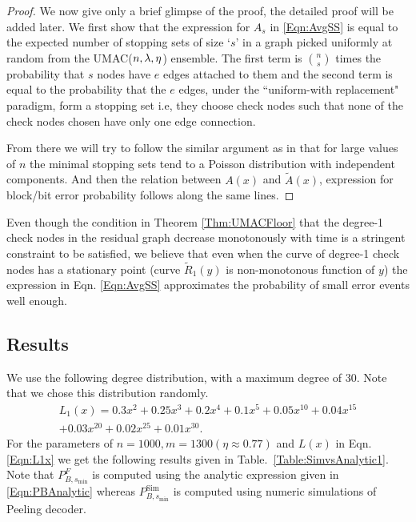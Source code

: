 \begin{proof}
We now give only a brief glimpse of the proof, the detailed proof will be added later. We first show that the expression for $A_{s}$ in \eqref{Eqn:AvgSS} is equal to the expected number of stopping sets of size `$s$' in a graph picked uniformly at random from the UMAC($n,\lambda,\eta$) ensemble. The first term is $\binom{n}{s}$ times the probability that $s$ nodes have $e$ edges attached to them and the second term is equal to the probability that the $e$ edges, under the ``uniform-with replacement" paradigm, form a stopping set i.e, they choose check nodes such that none of the check nodes chosen have only one edge connection.

From there we will try to follow the similar argument as in \cite{richardson2008modern} that for large values of $n$ the minimal stopping sets tend to a Poisson distribution with independent components. And then the relation between $A(x)$ and $\tilde{A}(x)$, expression for block/bit error probability follows along the same lines.
\end{proof}

\begin{remark}
Even though the condition in Theorem \ref{Thm:UMACFloor} that the degree-1 check nodes in the residual graph decrease monotonously with time is a stringent constraint to be satisfied, we believe that even when the curve of degree-1 check nodes has a stationary  point (curve $\tilde{R}_{1}(y)$ is non-monotonous function of $y$) the expression in Eqn. \eqref{Eqn:AvgSS}  approximates the probability of small error events well enough.
\end{remark}

\subsection{Results}
We use the following degree distribution, with a maximum degree of 30. Note that we chose this distribution randomly.
\begin{multline}
L_1(x)=0.3x^2+ 0.25 x^3+ 0.2 x^4 + 0.1 x^5+ 0.05 x^{10} + 0.04 x^{15}\\
 + 0.03 x^{20} + 0.02 x^{25}+ 0.01 x^{30}.
\label{Eqn:L1x}
\end{multline}
For the parameters of $n=1000, m=1300( \eta \approx 0.77)$ and $L(x)$ in Eqn. \eqref{Eqn:L1x} we get the following results given in Table.~\ref{Table:SimvsAnalytic1}. Note that $P_{B,s_{\text{min}}}^F$ is computed using the analytic expression given in \eqref{Eqn:PBAnalytic} whereas $P_{B,s_{\text{min}}}^{\text{Sim}}$ is computed using numeric simulations of Peeling decoder.


